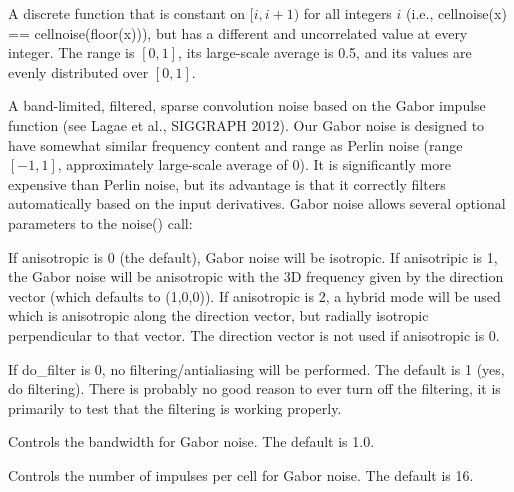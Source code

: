 \documentclass[11pt,letterpaper]{book}
\begin{document}
\vspace{12pt}
A discrete function that is constant on $[i,i+1)$ for all integers $i$
(i.e., {\cf cellnoise(x) == cellnoise(floor(x))}), but has a different
and uncorrelated value at every integer.  The range is $[0,1]$, its
large-scale average is 0.5, and its values are evenly distributed over
$[0,1]$.
\apiend

\vspace{12pt}
\NEW A band-limited, filtered, sparse convolution noise based on the
Gabor impulse function (see Lagae et al., SIGGRAPH 2012).  Our Gabor
noise is designed to have somewhat similar frequency content and range
as Perlin noise (range $[-1,1]$, approximately large-scale average of
$0$).  It is significantly more expensive than Perlin noise, but its
advantage is that it correctly filters automatically based on the input
derivatives.  Gabor noise allows several optional parameters to the
{\cf noise()} call:

\vspace{12pt}
If {\cf anisotropic} is 0 (the default), Gabor noise
will be isotropic.  If {\cf anisotripic} is 1, the Gabor noise will
be anisotropic with the 3D frequency given by the {\cf direction} 
vector (which defaults to {\cf (1,0,0)}).  If {\cf anisotropic} is
2, a hybrid mode will be used which is anisotropic along the
{\cf direction} vector, but radially isotropic perpendicular to that
vector.  The {\cf direction} vector is not used if {\cf anisotropic}
is 0.
\apiend
\vspace{-16pt}

\vspace{12pt}
If {\cf do_filter} is 0, no filtering/antialiasing will
be performed.  The default is 1 (yes, do filtering).  There is probably
no good reason to ever turn off the filtering, it is primarily to test
that the filtering is working properly.
\apiend
\vspace{-16pt}

\vspace{12pt}
Controls the bandwidth for Gabor noise.
The default is 1.0.
\apiend
\vspace{-16pt}

\vspace{12pt}
Controls the number of impulses per cell for Gabor noise.
The default is 16.
\apiend
\vspace{-16pt}
\end{document}
